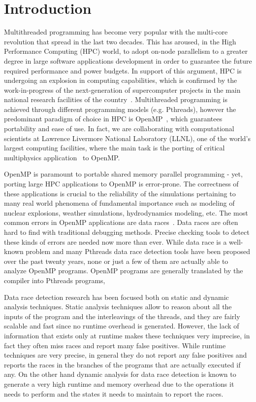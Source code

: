 \section{Introduction}
\label{sec:introduction}

Multithreaded programming has become very popular with the multi-core
revolution that spread in the last two decades.
%
This has aroused, in the High Performance Computing (HPC) world, to adopt
on-node parallelism to a greater degree in large software applications
development in order to guarantee the future required performance and power
budgets.
%
In support of this argument, HPC is undergoing an explosion in
computing capabilities, which is confirmed by the work-in-progress of the
next-generation of supercomputer projects in the main national research
facilities of the country~\cite{sierra, summit, trinity}.
%
Multithreaded programming is achieved through different programming models
(e.g. Pthreads), however the predominant paradigm of choice in HPC is
OpenMP~\cite{ompdoc}, which guarantees portability and ease of use.
%
In fact, we are collaborating with computational scientists at Lawrence
Livermore National Laboratory (LLNL), one of the world's largest computing
facilities, where the main task is the porting of critical multiphysics
application~\cite{llnl-apps} to OpenMP.

OpenMP is paramount to portable shared memory parallel programming - yet,
porting large HPC applications to OpenMP is error-prone.
%
The correctness of these applications is crucial to the reliability of the
simulations pertaining to many real world phenomena of fundamental importance
such as modeling of nuclear explosions, weather simulations, hydrodynamics
modeling, etc.
%
The most common errors in OpenMP applications are data
races~\cite{sus_common_2008}.
%
Data races are often hard to find with traditional debugging methods.
%
Precise checking tools to detect these kinds of errors are needed now more
than ever.
%
While data race is a well-known problem and many Pthreads data race detection
tools have been proposed over the past twenty years, none or just a few of
them are actually able to analyze OpenMP programs.
%
OpenMP programs are generally translated by the compiler into Pthreads
programs,

Data race detection research has been focused both on static and dynamic
analysis techniques.
%                                                 
Static analysis techniques allow to reason about all the inputs of the program
and the interleavings of the threads, and they are fairly scalable and fast
since no runtime overhead is generated.
%
However, the lack of information that exists only at runtime makes these
techniques very imprecise, in fact they often miss races and report many false
positives.
%
While runtime techniques are very precise, in general they do not
report any false positives and reports the races in the branches of the
programs that are actually executed if any.
%
On the other hand dynamic analysis for data race detection is known to
generate a very high runtime and memory overhead due to the operations it
needs to perform and the states it needs to maintain to report the races.


